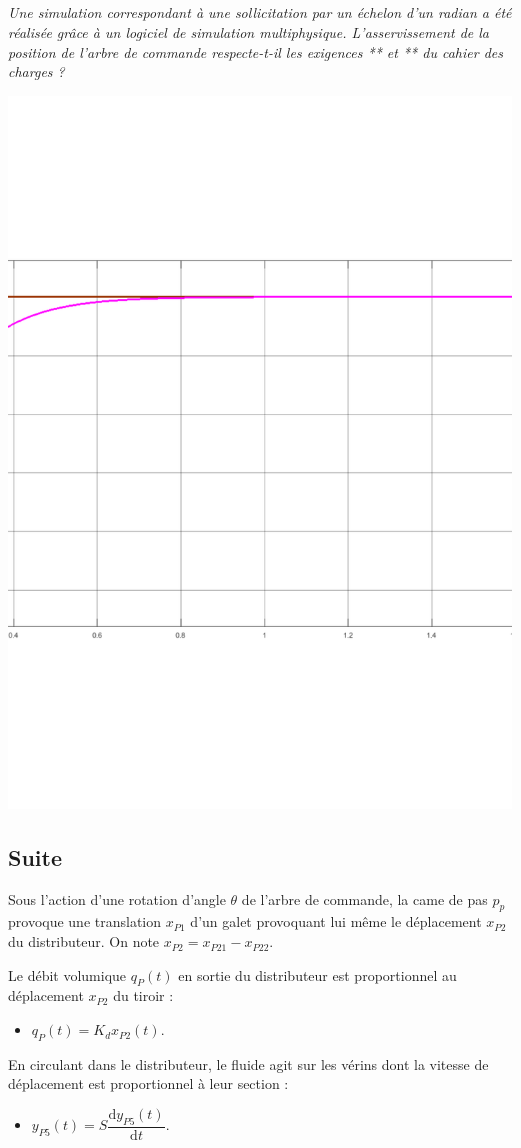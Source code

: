 \documentclass[10pt,fleqn]{article} %
\begin{document}
\begin{multicols}{2}
\subparagraph{}
\textit{Une simulation correspondant à une sollicitation par un échelon d'un radian a été réalisée grâce à un logiciel de simulation multiphysique. L'asservissement de la position de l'arbre de commande respecte-t-il les exigences ** et ** du cahier des charges ?}
\begin{center}
\includegraphics[width=.45\textwidth]{images/simulation}
\end{center}

\begin{corrige}

\end{corrige}


\subsection*{Suite}

Sous l'action d'une rotation d'angle $\theta$ de l'arbre de commande, la came de pas $p_p$ provoque une translation $x_{P1}$ d'un galet provoquant lui même le déplacement $x_{P2}$ du distributeur. On note $x_{P2}=x_{P21}-x_{P22}$.

Le débit volumique $q_P(t)$ en sortie du distributeur est proportionnel au déplacement $x_{P2}$ du tiroir : 
\begin{itemize}
\item $q_P(t)=K_d x_{P2}(t)$.
\end{itemize}

En circulant dans le distributeur, le fluide agit sur les vérins dont la vitesse de déplacement est proportionnel à leur section : 
\begin{itemize}
\item $y_{P5}(t)= S \dfrac{\text{d}y_{P5}(t)}{\text{d}t}$.
\end{itemize}



\end{multicols}
\end{document}

